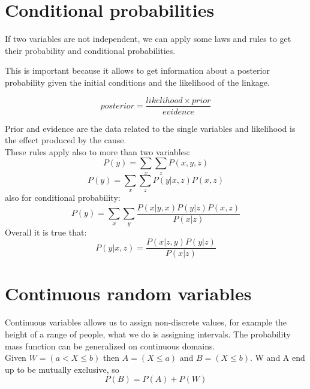 \section{Conditional probabilities}
If two variables are not independent, we can apply some laws and rules to get
their probability and conditional probabilities.



This is important because it allows to get information about a posterior
probability given the initial conditions and the likelihood of the linkage.

\[
	posterior = \frac{likelihood \times prior}{evidence}
\]

Prior and evidence are the data related to the single variables and likelihood is
the effect produced by the cause.\\ These rules apply also to more than two variables:
\[
	P(y) = \sum_{x}\sum_{z}P(x, y, z)
\]
\[
	P(y) = \sum_{x}\sum_{z}P(y | x, z) P(x, z)
\]
also for conditional probability:
\[
	P(y) = \sum_{x}\sum_{y}\frac{P(x|y, x)P(y|z)P(x, z)}{P(x|z)}
\]
Overall it is true that:
\[
	P(y|x, z) = \frac{P(x|z, y)P(y|z)}{P(x|z)}
\]

\section{Continuous random variables}
Continuous variables allows us to assign non-discrete values, for example the
height of a range of people, what we do is assigning intervals. The probability
mass function can be generalized on continuous domains.\\ Given
$W = (a < X \leq b)$ then $A = (X \leq a)$ and $B = (X \leq b)$. W and A end up to
be mutually exclusive, so
\[
	P(B) = P(A) + P(W)
\]


